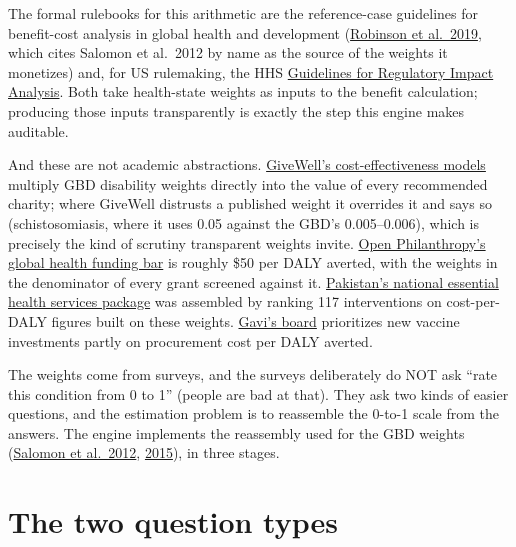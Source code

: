 \documentclass[11pt]{article}
\begin{document}
The formal rulebooks for this arithmetic are the reference-case guidelines for benefit-cost analysis in global health and development (\href{https://media.repository.chds.hsph.harvard.edu/static/filer_public/16/3c/163c0d02-1837-4e9b-b88b-d646bbea857c/2019_robinson_ref_case_guidelin_bca_proj_r_126.pdf}{Robinson et al.\ 2019}, which cites Salomon et al.\ 2012 by name as the source of the weights it monetizes) and, for US rulemaking, the HHS \href{https://aspe.hhs.gov/reports/guidelines-regulatory-impact-analysis}{Guidelines for Regulatory Impact Analysis}. Both take health-state weights as inputs to the benefit calculation; producing those inputs transparently is exactly the step this engine makes auditable.

And these are not academic abstractions. \href{https://www.givewell.org/how-we-work/our-criteria/cost-effectiveness/moral-weights}{GiveWell's cost-effectiveness models} multiply GBD disability weights directly into the value of every recommended charity; where GiveWell distrusts a published weight it overrides it and says so (schistosomiasis, where it uses 0.05 against the GBD's 0.005--0.006), which is precisely the kind of scrutiny transparent weights invite. \href{https://coefficientgiving.org/research/technical-updates-to-our-global-health-and-wellbeing-cause-prioritization-framework/}{Open Philanthropy's global health funding bar} is roughly \$50 per DALY averted, with the weights in the denominator of every grant screened against it. \href{https://www.dcp-3.org/news/pakistans-investment-universal-health-coverage}{Pakistan's national essential health services package} was assembled by ranking 117 interventions on cost-per-DALY figures built on these weights. \href{https://www.gavi.org/vaccineswork/gavis-impact-2023-seven-key-statistics}{Gavi's board} prioritizes new vaccine investments partly on procurement cost per DALY averted.

The weights come from surveys, and the surveys deliberately do NOT ask ``rate this condition from 0 to 1'' (people are bad at that). They ask two kinds of easier questions, and the estimation problem is to reassemble the 0-to-1 scale from the answers. The engine implements the reassembly used for the GBD weights (\href{https://doi.org/10.1016/S0140-6736(12)61680-8}{Salomon et al.\ 2012}, \href{https://doi.org/10.1016/S2214-109X(15)00069-8}{2015}), in three stages.

\section{The two question types}
\end{document}
